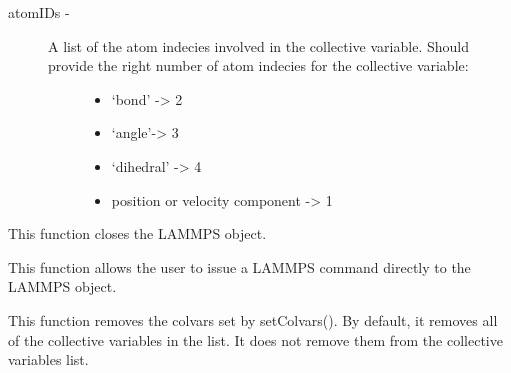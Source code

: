 \documentclass[letterpaper,10pt,english]{sphinxmanual}
\begin{document}
\begin{fulllineitems}
\begin{fulllineitems}
\begin{description}
\begin{description}
\begin{itemize}
\end{itemize}

\end{description}

\item[{atomIDs -}] \leavevmode\begin{description}
\item[{A list of the atom indecies involved in the collective variable. Should provide the right number of atom indecies for the collective variable:}] \leavevmode\begin{itemize}
\item {} 
`bond' -\textgreater{} 2

\item {} 
`angle'-\textgreater{} 3

\item {} 
`dihedral' -\textgreater{} 4

\item {} 
position or velocity component -\textgreater{} 1

\end{itemize}

\end{description}

\end{description}

\end{fulllineitems}


\begin{fulllineitems}
\label{walker_api/walker_api.doc:lammpsWalker.lammpsWalker.close}
This function closes the LAMMPS object.

\end{fulllineitems}


\begin{fulllineitems}
\label{walker_api/walker_api.doc:lammpsWalker.lammpsWalker.command}
This function allows the user to issue a LAMMPS command directly to the
LAMMPS object.

\end{fulllineitems}


\begin{fulllineitems}
\label{walker_api/walker_api.doc:lammpsWalker.lammpsWalker.destroyColvars}
This function removes the colvars set by setColvars(). By default, it removes all of the collective variables in the list. It does not remove them from the collective variables list.


\end{fulllineitems}
\end{fulllineitems}
\end{document}
